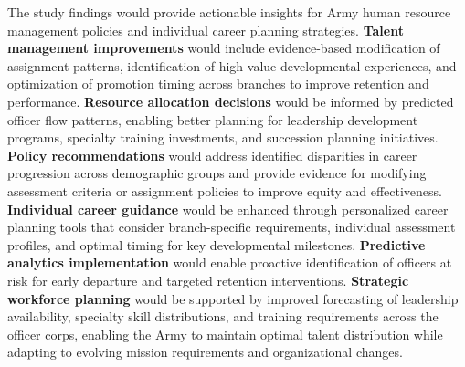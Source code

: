 \documentclass[main.tex]{subfiles}
\begin{document}
The study findings would provide actionable insights for Army human resource management policies and individual career planning strategies. \textbf{Talent management improvements} would include evidence-based modification of assignment patterns, identification of high-value developmental experiences, and optimization of promotion timing across branches to improve retention and performance. \textbf{Resource allocation decisions} would be informed by predicted officer flow patterns, enabling better planning for leadership development programs, specialty training investments, and succession planning initiatives. \textbf{Policy recommendations} would address identified disparities in career progression across demographic groups and provide evidence for modifying assessment criteria or assignment policies to improve equity and effectiveness. \textbf{Individual career guidance} would be enhanced through personalized career planning tools that consider branch-specific requirements, individual assessment profiles, and optimal timing for key developmental milestones. \textbf{Predictive analytics implementation} would enable proactive identification of officers at risk for early departure and targeted retention interventions. \textbf{Strategic workforce planning} would be supported by improved forecasting of leadership availability, specialty skill distributions, and training requirements across the officer corps, enabling the Army to maintain optimal talent distribution while adapting to evolving mission requirements and organizational changes.

\end{document}

